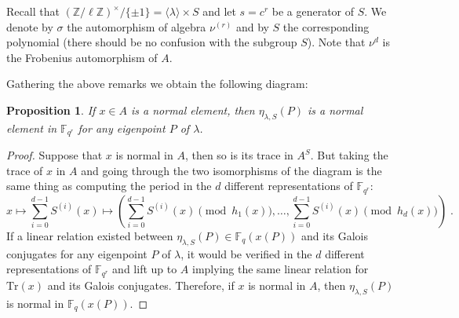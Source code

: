\documentclass[12pt]{article}
\theoremstyle{plain}
\newtheorem{proposition}[theorem]{Proposition}
\theoremstyle{definition}
\def\Z{\ensuremath{\mathbb{Z}}}
\def\F{\ensuremath{\mathbb{F}}}
\begin{document}
Recall that
$(\Z/\ell\Z)^{\times}/\{\pm 1\} = \langle{\lambda}\rangle \times S$
and let $s = c^r$ be a generator of $S$.
We denote by $\sigma$ the automorphism of algebra $\nu^{(r)}$
and by $S$ the corresponding polynomial
(there should be no confusion with the subgroup $S$).
Note that $\nu^d$ is the Frobenius automorphism of $A$.

Gathering the above remarks we obtain the following diagram:
\begin{center}
\end{center}

\begin{proposition}
\label{prop:xnormal}
If $x \in A$ is a normal element,
then $\eta_{\lambda,S}(P)$ is a normal element in $\F_{q^r}$
for any eigenpoint $P$ of $\lambda$.
\end{proposition}

\begin{proof}
Suppose that $x$ is normal in $A$, then so is its trace in $A^S$.
But taking the trace of $x$ in $A$ and going through the two isomorphisms
of the diagram is the same thing as computing the period in the
$d$ different representations of $\F_{q^r}$:
\[
x \mapsto \sum_{i=0}^{d-1} S^{(i)}(x) \mapsto
\left( \sum_{i=0}^{d-1} S^{(i)}(x) \pmod{h_1(x)}, \ldots,
\sum_{i=0}^{d-1} S^{(i)}(x) \pmod{h_d(x)} \right) \; .
\]
If a linear relation existed between $\eta_{\lambda,S}(P) \in \F_q(x(P))$
and its Galois conjugates for any eigenpoint $P$ of $\lambda$,
it would be verified in the $d$ different representations of $\F_{q^r}$
and lift up to $A$ implying the same linear relation for
$\mathrm{Tr}(x)$ and its Galois conjugates.
Therefore, if $x$ is normal in $A$,
then $\eta_{\lambda,S}(P)$ is normal in $\F_q(x(P))$.
\end{proof}
\end{document}
